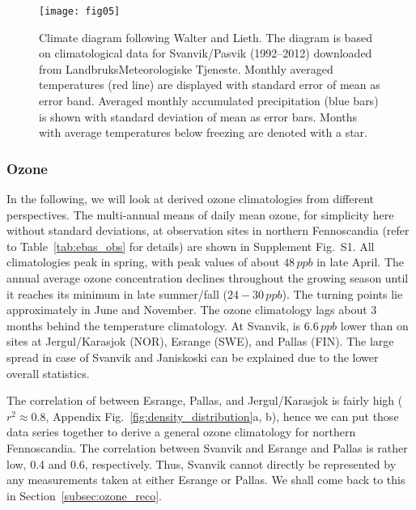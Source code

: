 \documentclass[bg, manuscript]{copernicus}
\begin{document}
\begin{figure}[t]
  \texttt{[image: fig05]}
  \caption{Climate diagram following Walter and Lieth. The diagram is based on climatological data for Svanvik/Pasvik (1992--2012) downloaded from LandbruksMeteorologiske Tjeneste. Monthly averaged temperatures (red line) are displayed with standard error of mean as error band. Averaged monthly accumulated precipitation (blue bars) is shown with standard deviation of mean as error bars. Months with average temperatures below freezing are denoted with a star.}
  \label{fig:climatediagram}
\end{figure}

\subsubsection{Ozone}
\label{subsubsec:clim_ozone}
In the following, we will look at derived ozone climatologies from different perspectives.
The multi-annual means of daily mean ozone, for simplicity here without standard deviations, at observation sites in northern Fennoscandia (refer to Table~\ref{tab:ebas_obs} for details) are shown in Supplement Fig.~S1. All climatologies peak in spring, with peak values of about $48\,\unit{ppb}$ in late April. The annual average ozone concentration \chem{\left<[O_3]\right>} declines throughout the growing season until it reaches its minimum in late summer/fall ($24-30\,\unit{ppb}$). The turning points lie approximately in June and November. The ozone climatology lags about 3 months behind the temperature climatology. At Svanvik, \chem{\left<[O_3]\right>} is $6.6\,\unit{ppb}$ lower than on sites at Jergul/Karasjok (NOR), Esrange (SWE), and Pallas (FIN). The large spread in case of Svanvik and Janiskoski can be explained due to the lower overall statistics.

The correlation of \chem{[O_3]} between Esrange, Pallas, and Jergul/Karasjok is fairly high ($r^2\approx 0.8$, Appendix Fig.~\ref{fig:density_distribution}a, b), hence we can put those data series together to derive a general ozone climatology for northern Fennoscandia. The correlation between Svanvik and Esrange and Pallas is rather low, 0.4 and 0.6, respectively. Thus, Svanvik cannot directly be represented by any measurements taken at either Esrange or Pallas. We shall come back to this in Section~\ref{subsec:ozone_reco}.
\end{document}
